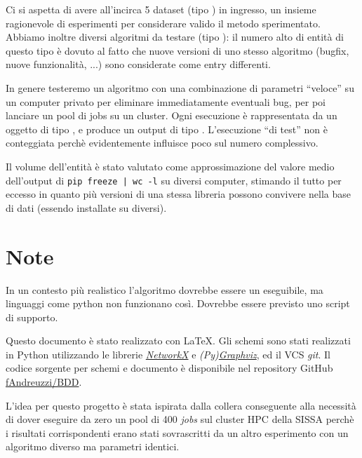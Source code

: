\documentclass{article}
\begin{document}
Ci si aspetta di avere all'incirca 5 dataset (tipo ) in ingresso, un insieme ragionevole di esperimenti per considerare valido il metodo sperimentato. Abbiamo inoltre diversi algoritmi da testare  (tipo ): il numero alto di entità di questo tipo è dovuto al fatto che nuove versioni di uno stesso algoritmo (bugfix, nuove funzionalità, ...) sono considerate come entry differenti.

In genere testeremo un algoritmo con una combinazione di parametri ``veloce'' su un computer privato per eliminare immediatamente eventuali bug, per poi lanciare un pool di jobs su un cluster. Ogni esecuzione è rappresentata da un oggetto di tipo , e produce un output di tipo . L'esecuzione ``di test'' non è conteggiata perchè evidentemente influisce poco sul numero complessivo.

Il volume dell'entità  è stato valutato come approssimazione del valore medio dell'output di \texttt{pip freeze | wc -l} su diversi computer, stimando il tutto per eccesso in quanto più versioni di una stessa libreria possono convivere nella base di dati (essendo installate su  diversi).

\section{Note}
In un contesto più realistico l'algoritmo dovrebbe essere un eseguibile, ma linguaggi come python non funzionano così. Dovrebbe essere previsto uno script di supporto.

Questo documento è stato realizzato con \LaTeX. Gli schemi sono stati realizzati in Python utilizzando le librerie \href{https://networkx.org/documentation/stable/index.html}{\emph{NetworkX}} e \emph{(Py)\href{http://www.graphviz.org/}{Graphviz}}, ed il VCS \emph{git}. Il codice sorgente per schemi e documento è disponibile nel repository GitHub \href{https://github.com/fAndreuzzi/BDD}{fAndreuzzi/BDD}.

L'idea per questo progetto è stata ispirata dalla collera conseguente alla necessità di dover eseguire da zero un pool di 400 \emph{jobs} sul cluster HPC della SISSA perchè i risultati corrispondenti erano stati sovrascritti da un altro esperimento con un algoritmo diverso ma parametri identici.
\end{document}
